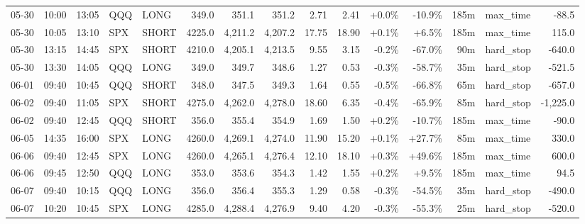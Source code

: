 \documentclass[11pt,a4paper,twoside]{article}
\begin{document}
\begin{landscape}
\begin{center}
\begin{longtable}{>{\color{txtmain}}l l l l l r r r r r r r r >{\color{txtmain}}l r}
05-30 & 10:00 & 13:05 & QQQ & LONG & 349.0 & 351.1 & 351.2 & 2.71 & 2.41 & \textcolor{wingreen}{+0.0\%} & \textcolor{lossred}{-10.9\%} & 185m & max\_time & \textcolor{lossred}{-88.5} \\
05-30 & 10:05 & 13:10 & SPX & SHORT & 4225.0 & 4,211.2 & 4,207.2 & 17.75 & 18.90 & \textcolor{wingreen}{+0.1\%} & \textcolor{wingreen}{+6.5\%} & 185m & max\_time & \textcolor{wingreen}{115.0} \\
05-30 & 13:15 & 14:45 & SPX & SHORT & 4210.0 & 4,205.1 & 4,213.5 & 9.55 & 3.15 & \textcolor{lossred}{-0.2\%} & \textcolor{lossred}{-67.0\%} & 90m & hard\_stop & \textcolor{lossred}{-640.0} \\
05-30 & 13:30 & 14:05 & QQQ & LONG & 349.0 & 349.7 & 348.6 & 1.27 & 0.53 & \textcolor{lossred}{-0.3\%} & \textcolor{lossred}{-58.7\%} & 35m & hard\_stop & \textcolor{lossred}{-521.5} \\
06-01 & 09:40 & 10:45 & QQQ & SHORT & 348.0 & 347.5 & 349.3 & 1.64 & 0.55 & \textcolor{lossred}{-0.5\%} & \textcolor{lossred}{-66.8\%} & 65m & hard\_stop & \textcolor{lossred}{-657.0} \\
06-02 & 09:40 & 11:05 & SPX & SHORT & 4275.0 & 4,262.0 & 4,278.0 & 18.60 & 6.35 & \textcolor{lossred}{-0.4\%} & \textcolor{lossred}{-65.9\%} & 85m & hard\_stop & \textcolor{lossred}{-1,225.0} \\
06-02 & 09:40 & 12:45 & QQQ & SHORT & 356.0 & 355.4 & 354.9 & 1.69 & 1.50 & \textcolor{wingreen}{+0.2\%} & \textcolor{lossred}{-10.7\%} & 185m & max\_time & \textcolor{lossred}{-90.0} \\
06-05 & 14:35 & 16:00 & SPX & LONG & 4260.0 & 4,269.1 & 4,274.0 & 11.90 & 15.20 & \textcolor{wingreen}{+0.1\%} & \textcolor{wingreen}{+27.7\%} & 85m & max\_time & \textcolor{wingreen}{330.0} \\
06-06 & 09:40 & 12:45 & SPX & LONG & 4260.0 & 4,265.1 & 4,276.4 & 12.10 & 18.10 & \textcolor{wingreen}{+0.3\%} & \textcolor{wingreen}{+49.6\%} & 185m & max\_time & \textcolor{wingreen}{600.0} \\
06-06 & 09:45 & 12:50 & QQQ & LONG & 353.0 & 353.6 & 354.3 & 1.42 & 1.55 & \textcolor{wingreen}{+0.2\%} & \textcolor{wingreen}{+9.5\%} & 185m & max\_time & \textcolor{wingreen}{94.5} \\
06-07 & 09:40 & 10:15 & QQQ & LONG & 356.0 & 356.4 & 355.3 & 1.29 & 0.58 & \textcolor{lossred}{-0.3\%} & \textcolor{lossred}{-54.5\%} & 35m & hard\_stop & \textcolor{lossred}{-490.0} \\
06-07 & 10:20 & 10:45 & SPX & LONG & 4285.0 & 4,288.4 & 4,276.9 & 9.40 & 4.20 & \textcolor{lossred}{-0.3\%} & \textcolor{lossred}{-55.3\%} & 25m & hard\_stop & \textcolor{lossred}{-520.0} \\

\end{longtable}
\end{center}
\end{landscape}
\end{document}
